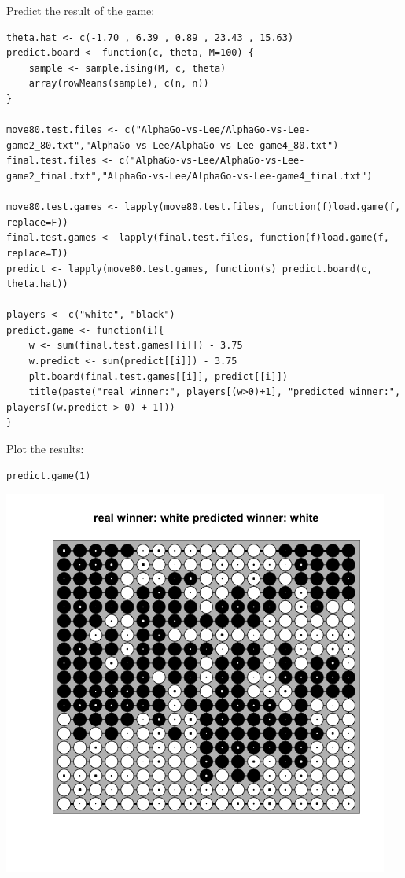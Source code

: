 \documentclass[11pt]{article}
\begin{document}
Predict the result of the game:
\begin{verbatim}
theta.hat <- c(-1.70 , 6.39 , 0.89 , 23.43 , 15.63)
predict.board <- function(c, theta, M=100) {
    sample <- sample.ising(M, c, theta)
    array(rowMeans(sample), c(n, n))
}

move80.test.files <- c("AlphaGo-vs-Lee/AlphaGo-vs-Lee-game2_80.txt","AlphaGo-vs-Lee/AlphaGo-vs-Lee-game4_80.txt")
final.test.files <- c("AlphaGo-vs-Lee/AlphaGo-vs-Lee-game2_final.txt","AlphaGo-vs-Lee/AlphaGo-vs-Lee-game4_final.txt")

move80.test.games <- lapply(move80.test.files, function(f)load.game(f, replace=F))
final.test.games <- lapply(final.test.files, function(f)load.game(f, replace=T))
predict <- lapply(move80.test.games, function(s) predict.board(c, theta.hat))

players <- c("white", "black")
predict.game <- function(i){
    w <- sum(final.test.games[[i]]) - 3.75
    w.predict <- sum(predict[[i]]) - 3.75
    plt.board(final.test.games[[i]], predict[[i]])
    title(paste("real winner:", players[(w>0)+1], "predicted winner:", players[(w.predict > 0) + 1]))
}
\end{verbatim}


Plot the results:

\begin{verbatim}
predict.game(1)
\end{verbatim}

\begin{center}
\includegraphics[width=.9\linewidth]{img/game1.png}
\end{center}
\end{document}
